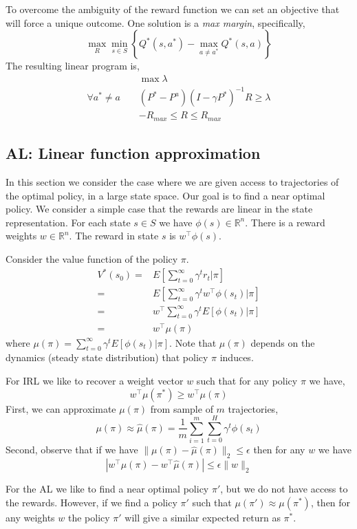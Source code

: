 To overcome the ambiguity of the reward function we can set an
objective that will force a unique outcome. One solution is a {\em
max margin}, specifically,
\[
\max_R \min_{s\in S} \left\{ Q^*(s,a^*)-\max_{a\neq a^*} Q^*(s,a) \right\}
\]
The resulting linear program is,\\
\begin{align*}
&\max \lambda\\
\forall a^*\neq a\;\;\;\; & (P^*-P^a) (I-\gamma P^*)^{-1}R\geq \lambda  \\
&-R_{max}\leq R\leq R_{max}
\end{align*}


\subsection{AL: Linear function approximation}

In this section we consider the case where we are given access to
trajectories of the optimal policy, in a large state space. Our goal
is to find a near optimal policy.
%
We consider a  simple case that the rewards are linear in the state
representation. For each state $s\in S$ we have
$\phi(s)\in\mathbb{R}^n$. There is a reward weights
$w\in\mathbb{R}^n$. The reward in state $s$ is $w^\top \phi(s)$.

Consider the value function of the policy $\pi$.
\begin{align*}
V^*(s_0) =& E[\sum_{t=0}^\infty \gamma^t r_t|\pi]\\
 =& E[\sum_{t=0}^\infty \gamma^t w^\top \phi(s_t)|\pi]\\
 =& w^\top  \sum_{t=0}^\infty \gamma^tE[ \phi(s_t)|\pi]\\
 =& w^\top \mu(\pi)
\end{align*}
where $\mu(\pi)=\sum_{t=0}^\infty \gamma^tE[ \phi(s_t)|\pi]$. Note
that $\mu(\pi)$ depends on the dynamics (steady state distribution)
that policy $\pi$ induces.

For IRL we like to recover a weight vector $w$ such that for any
policy $\pi$ we have,
\[
w^\top \mu(\pi^*)\geq w^\top \mu(\pi)
\]
First, we can approximate $\mu(\pi)$ from sample of $m$
trajectories,
\[
\mu(\pi)\approx \hat{\mu}(\pi)=\frac{1}{m}\sum_{i=1}^m \sum_{t=0}^H
\gamma^t \phi(s_t)
\]
Second, observe that if we have $\|\mu(\pi)-\hat{\mu}(\pi)\|_2\leq
\epsilon$ then for any $w$ we have
\[
|w^\top \mu(\pi)-w^\top\hat{\mu}(\pi)|\leq \epsilon \|w\|_2
\]

For the AL we like to find a near optimal policy $\pi'$, but we do
not have access to the rewards. However, if we find a policy $\pi'$
such that $\mu(\pi')\approx\mu(\pi^*)$, then for any weights $w$ the
policy $\pi'$ will give a similar expected return as $\pi^*$.

